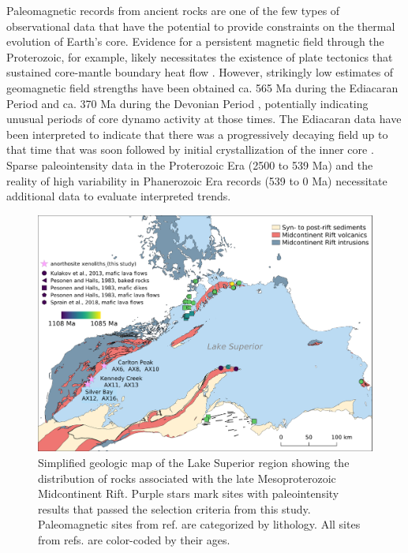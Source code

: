 \documentclass[9pt,twocolumn,twoside,lineno]{pnas-new}
\begin{document}
Paleomagnetic records from ancient rocks are one of the few types of observational data that have the potential to provide constraints on the thermal evolution of Earth’s core. Evidence for a persistent magnetic field through the Proterozoic, for example, likely necessitates the existence of plate tectonics that sustained core-mantle boundary heat flow \cite{Swanson-Hysell2021c}. However, strikingly low estimates of geomagnetic field strengths have been obtained ca. 565 Ma during the Ediacaran Period \cite{Bono2019a, Shcherbakova2019a,Thallner2021b} and ca. 370 Ma during the Devonian Period \cite{Shcherbakova2017a, Shcherbakova2021a, Hawkins2021a}, potentially indicating unusual periods of core dynamo activity at those times. The Ediacaran data have been interpreted to indicate that there was a progressively decaying field up to that time that was soon followed by initial crystallization of the inner core \cite{Bono2019a}. Sparse paleointensity data in the Proterozoic Era (2500 to 539 Ma) and the reality of high variability in Phanerozoic Era records (539 to 0 Ma) necessitate additional data to evaluate interpreted trends. 


\begin{figure}
\centering
\noindent\includegraphics[width=11.4 cm]{Geologic_map.pdf}
\caption{\footnotesize{Simplified geologic map of the Lake Superior region showing the distribution of rocks associated with the late Mesoproterozoic Midcontinent Rift. Purple stars mark sites with paleointensity results that passed the selection criteria from this study. Paleomagnetic sites from ref. \citealp{Pesonen1983a} are categorized by lithology. All sites from refs. \citealp{Pesonen1983a, Kulakov2013a, Sprain2018a} are color-coded by their ages.}}
\label{fig:Geologic_map}
\end{figure}
\end{document}

